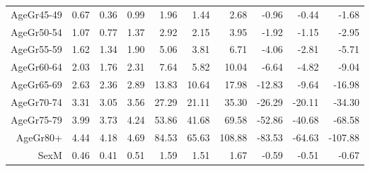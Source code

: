 \begin{table}[ht]
\begin{tabular}{rrrrrrrrrr}
  AgeGr45-49 & 0.67 & 0.36 & 0.99 & 1.96 & 1.44 & 2.68 & -0.96 & -0.44 & -1.68 \\ 
  AgeGr50-54 & 1.07 & 0.77 & 1.37 & 2.92 & 2.15 & 3.95 & -1.92 & -1.15 & -2.95 \\ 
  AgeGr55-59 & 1.62 & 1.34 & 1.90 & 5.06 & 3.81 & 6.71 & -4.06 & -2.81 & -5.71 \\ 
  AgeGr60-64 & 2.03 & 1.76 & 2.31 & 7.64 & 5.82 & 10.04 & -6.64 & -4.82 & -9.04 \\ 
  AgeGr65-69 & 2.63 & 2.36 & 2.89 & 13.83 & 10.64 & 17.98 & -12.83 & -9.64 & -16.98 \\ 
  AgeGr70-74 & 3.31 & 3.05 & 3.56 & 27.29 & 21.11 & 35.30 & -26.29 & -20.11 & -34.30 \\ 
  AgeGr75-79 & 3.99 & 3.73 & 4.24 & 53.86 & 41.68 & 69.58 & -52.86 & -40.68 & -68.58 \\ 
  AgeGr80+ & 4.44 & 4.18 & 4.69 & 84.53 & 65.63 & 108.88 & -83.53 & -64.63 & -107.88 \\ 
  SexM & 0.46 & 0.41 & 0.51 & 1.59 & 1.51 & 1.67 & -0.59 & -0.51 & -0.67 \\ 
   \hline
\end{tabular}
\end{table}
